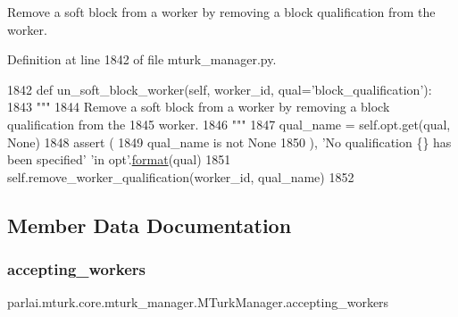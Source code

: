 \begin{DoxyVerb}Remove a soft block from a worker by removing a block qualification from the
worker.
\end{DoxyVerb}
 

Definition at line 1842 of file mturk\+\_\+manager.\+py.


\begin{DoxyCode}
1842     \textcolor{keyword}{def }un\_soft\_block\_worker(self, worker\_id, qual='block\_qualification'):
1843         \textcolor{stringliteral}{"""}
1844 \textcolor{stringliteral}{        Remove a soft block from a worker by removing a block qualification from the}
1845 \textcolor{stringliteral}{        worker.}
1846 \textcolor{stringliteral}{        """}
1847         qual\_name = self.opt.get(qual, \textcolor{keywordtype}{None})
1848         \textcolor{keyword}{assert} (
1849             qual\_name \textcolor{keywordflow}{is} \textcolor{keywordflow}{not} \textcolor{keywordtype}{None}
1850         ), \textcolor{stringliteral}{'No qualification \{\} has been specified'} \textcolor{stringliteral}{'in opt'}.\hyperlink{namespaceparlai_1_1chat__service_1_1services_1_1messenger_1_1shared__utils_a32e2e2022b824fbaf80c747160b52a76}{format}(qual)
1851         self.remove\_worker\_qualification(worker\_id, qual\_name)
1852 
\end{DoxyCode}


\subsection{Member Data Documentation}
\mbox{\label{classparlai_1_1mturk_1_1core_1_1mturk__manager_1_1MTurkManager_ae070143dc4cbb806d0687c7777f0c422}} 
\subsubsection{\texorpdfstring{accepting\+\_\+workers}{accepting\_workers}}
{\footnotesize\ttfamily parlai.\+mturk.\+core.\+mturk\+\_\+manager.\+M\+Turk\+Manager.\+accepting\+\_\+workers}



